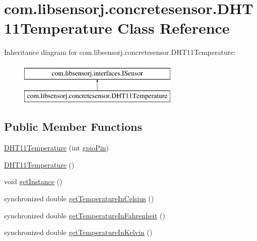 \hypertarget{classcom_1_1libsensorj_1_1concretesensor_1_1DHT11Temperature}{}\section{com.\+libsensorj.\+concretesensor.\+D\+H\+T11\+Temperature Class Reference}
\label{classcom_1_1libsensorj_1_1concretesensor_1_1DHT11Temperature}
Inheritance diagram for com.\+libsensorj.\+concretesensor.\+D\+H\+T11\+Temperature\+:\begin{figure}[H]
\begin{center}
\leavevmode
\includegraphics[height=2.000000cm]{classcom_1_1libsensorj_1_1concretesensor_1_1DHT11Temperature}
\end{center}
\end{figure}
\subsection*{Public Member Functions}
\begin{DoxyCompactItemize}
\item 
\hyperlink{classcom_1_1libsensorj_1_1concretesensor_1_1DHT11Temperature_a81324fa18ad12062d493a880f3fbda67}{D\+H\+T11\+Temperature} (int \hyperlink{classcom_1_1libsensorj_1_1concretesensor_1_1DHT11Temperature_a312572f2f0bad8b41d171481ef4e3138}{gpio\+Pin})
\item 
\hyperlink{classcom_1_1libsensorj_1_1concretesensor_1_1DHT11Temperature_a02bbdf30c922adcbde84597bf698ff41}{D\+H\+T11\+Temperature} ()
\item 
void \hyperlink{classcom_1_1libsensorj_1_1concretesensor_1_1DHT11Temperature_a599358623598fb0076dc0a2e07978f0b}{get\+Instance} ()
\item 
synchronized double \hyperlink{classcom_1_1libsensorj_1_1concretesensor_1_1DHT11Temperature_ab0b6a73583d9244271174a3d896f5ed3}{get\+Temperature\+In\+Celsius} ()
\item 
synchronized double \hyperlink{classcom_1_1libsensorj_1_1concretesensor_1_1DHT11Temperature_aa564f9c66609426711cbd0fbfe6837e3}{get\+Temperature\+In\+Fahrenheit} ()
\item 
synchronized double \hyperlink{classcom_1_1libsensorj_1_1concretesensor_1_1DHT11Temperature_a2c1a2bfaaf97612a862079979394ff34}{get\+Temperature\+In\+Kelvin} ()
\end{DoxyCompactItemize}
